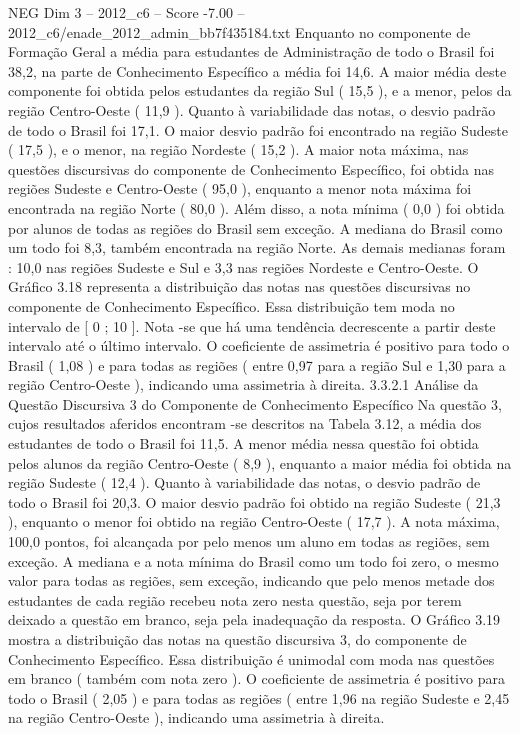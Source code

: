 \begin{textsample}{NEG Dim 3 – 2012\_c6 – Score -7.00 – 2012\_c6/enade\_2012\_admin\_bb7f435184.txt}
Enquanto no componente de Formação Geral a média para estudantes de Administração de todo o Brasil foi 38,2, na parte de Conhecimento Específico a média foi 14,6.
A maior média deste componente foi obtida pelos estudantes da região Sul ( 15,5 ), e a menor, pelos da região Centro-Oeste ( 11,9 ).
Quanto à variabilidade das notas, o desvio padrão de todo o Brasil foi 17,1.
O maior desvio padrão foi encontrado na região Sudeste ( 17,5 ), e o menor, na região Nordeste ( 15,2 ).
A maior nota máxima, nas questões discursivas do componente de Conhecimento Específico, foi obtida nas regiões Sudeste e Centro-Oeste ( 95,0 ), enquanto a menor nota máxima foi encontrada na região Norte ( 80,0 ).
Além disso, a nota mínima ( 0,0 ) foi obtida por alunos de todas as regiões do Brasil sem exceção.
A mediana do Brasil como um todo foi 8,3, também encontrada na região Norte.
As demais medianas foram : 10,0 nas regiões Sudeste e Sul e 3,3 nas regiões Nordeste e Centro-Oeste.
O Gráfico 3.18 representa a distribuição das notas nas questões discursivas no componente de Conhecimento Específico.
Essa distribuição tem moda no intervalo de [ 0 ; 10 ].
Nota -se que há uma tendência decrescente a partir deste intervalo até o último intervalo.
O coeficiente de assimetria é positivo para todo o Brasil ( 1,08 ) e para todas as regiões ( entre 0,97 para a região Sul e 1,30 para a região Centro-Oeste ), indicando uma assimetria à direita. 3.3.2.1 Análise da Questão Discursiva 3 do Componente de Conhecimento Específico Na questão 3, cujos resultados aferidos encontram -se descritos na Tabela 3.12, a média dos estudantes de todo o Brasil foi 11,5.
A menor média nessa questão foi obtida pelos alunos da região Centro-Oeste ( 8,9 ), enquanto a maior média foi obtida na região Sudeste ( 12,4 ).
Quanto à variabilidade das notas, o desvio padrão de todo o Brasil foi 20,3.
O maior desvio padrão foi obtido na região Sudeste ( 21,3 ), enquanto o menor foi obtido na região Centro-Oeste ( 17,7 ).
A nota máxima, 100,0 pontos, foi alcançada por pelo menos um aluno em todas as regiões, sem exceção.
A mediana e a nota mínima do Brasil como um todo foi zero, o mesmo valor para todas as regiões, sem exceção, indicando que pelo menos metade dos estudantes de cada região recebeu nota zero nesta questão, seja por terem deixado a questão em branco, seja pela inadequação da resposta.
O Gráfico 3.19 mostra a distribuição das notas na questão discursiva 3, do componente de Conhecimento Específico.
Essa distribuição é unimodal com moda nas questões em branco ( também com nota zero ).
O coeficiente de assimetria é positivo para todo o Brasil ( 2,05 ) e para todas as regiões ( entre 1,96 na região Sudeste e 2,45 na região Centro-Oeste ), indicando uma assimetria à direita.

\end{textsample}
